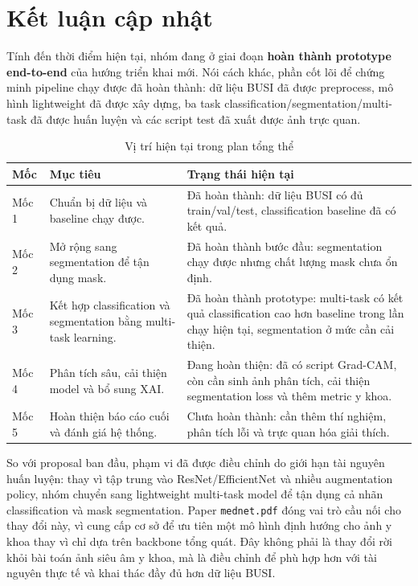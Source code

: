 \documentclass[12pt,a4paper]{article}
\begin{document}
\section{Kết luận cập nhật}

Tính đến thời điểm hiện tại, nhóm đang ở giai đoạn \textbf{hoàn thành prototype end-to-end} của hướng triển khai mới. Nói cách khác, phần cốt lõi để chứng minh pipeline chạy được đã hoàn thành: dữ liệu BUSI đã được preprocess, mô hình lightweight đã được xây dựng, ba task classification/segmentation/multi-task đã được huấn luyện và các script test đã xuất được ảnh trực quan.

\begin{table}[H]
\centering
\caption{Vị trí hiện tại trong plan tổng thể}
\renewcommand{\arraystretch}{1.25}
\begin{tabular}{p{3.2cm} p{5.4cm} p{6.2cm}}
\toprule
\textbf{Mốc} & \textbf{Mục tiêu} & \textbf{Trạng thái hiện tại} \\
\midrule
Mốc 1 & Chuẩn bị dữ liệu và baseline chạy được. & Đã hoàn thành: dữ liệu BUSI có đủ train/val/test, classification baseline đã có kết quả. \\
Mốc 2 & Mở rộng sang segmentation để tận dụng mask. & Đã hoàn thành bước đầu: segmentation chạy được nhưng chất lượng mask chưa ổn định. \\
Mốc 3 & Kết hợp classification và segmentation bằng multi-task learning. & Đã hoàn thành prototype: multi-task có kết quả classification cao hơn baseline trong lần chạy hiện tại, segmentation ở mức cần cải thiện. \\
Mốc 4 & Phân tích sâu, cải thiện model và bổ sung XAI. & Đang hoàn thiện: đã có script Grad-CAM, còn cần sinh ảnh phân tích, cải thiện segmentation loss và thêm metric y khoa. \\
Mốc 5 & Hoàn thiện báo cáo cuối và đánh giá hệ thống. & Chưa hoàn thành: cần thêm thí nghiệm, phân tích lỗi và trực quan hóa giải thích. \\
\bottomrule
\end{tabular}
\end{table}

So với proposal ban đầu, phạm vi đã được điều chỉnh do giới hạn tài nguyên huấn luyện: thay vì tập trung vào ResNet/EfficientNet và nhiều augmentation policy, nhóm chuyển sang lightweight multi-task model để tận dụng cả nhãn classification và mask segmentation. Paper \texttt{mednet.pdf} đóng vai trò cầu nối cho thay đổi này, vì cung cấp cơ sở để ưu tiên một mô hình định hướng cho ảnh y khoa thay vì chỉ dựa trên backbone tổng quát. Đây không phải là thay đổi rời khỏi bài toán ảnh siêu âm y khoa, mà là điều chỉnh để phù hợp hơn với tài nguyên thực tế và khai thác đầy đủ hơn dữ liệu BUSI.
\end{document}
